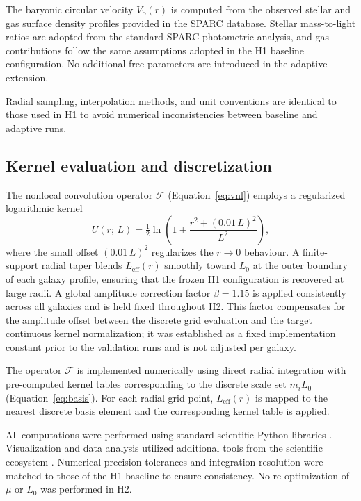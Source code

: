 \documentclass[twocolumn,linenumbers]{aastex701}
\begin{document}
The baryonic circular velocity $V_{\mathrm{b}}(r)$ is computed from the
observed stellar and gas surface density profiles provided in the SPARC
database. Stellar mass-to-light ratios are adopted from the standard SPARC
photometric analysis, and gas contributions follow the same assumptions
adopted in the H1 baseline configuration. No additional free parameters
are introduced in the adaptive extension.

Radial sampling, interpolation methods, and unit conventions are identical
to those used in H1 to avoid numerical inconsistencies between baseline
and adaptive runs.

\subsection{Kernel evaluation and discretization}

The nonlocal convolution operator $\mathcal{F}$ (Equation~\ref{eq:vnl}) employs
a regularized logarithmic kernel
\begin{equation}
	U(r;\,L) = \tfrac{1}{2}\ln\!\left(1 + \frac{r^2 + (0.01\,L)^2}{L^2}\right),
	\label{eq:kernel}
\end{equation}
where the small offset $(0.01\,L)^2$ regularizes the $r \to 0$ behaviour.
A finite-support radial taper blends $L_{\mathrm{eff}}(r)$ smoothly toward
$L_0$ at the outer boundary of each galaxy profile, ensuring that the
frozen H1 configuration is recovered at large radii. A global amplitude
correction factor $\beta = 1.15$ is applied consistently across all
galaxies and is held fixed throughout H2. This factor compensates for
the amplitude offset between the discrete grid evaluation and the target
continuous kernel normalization; it was established as a fixed
implementation constant prior to the validation runs and is not adjusted
per galaxy.

The operator $\mathcal{F}$ is implemented numerically using direct radial
integration with pre-computed kernel tables corresponding to the discrete
scale set $m_i L_0$ (Equation~\ref{eq:basis}). For each radial grid point,
$L_{\mathrm{eff}}(r)$ is mapped to the nearest discrete basis element and
the corresponding kernel table is applied.

All computations were performed using standard scientific Python libraries
\citep{numpy2020, scipy2020}. Visualization and data analysis utilized
additional tools from the scientific ecosystem \citep{matplotlib2007,
pandas2010}. Numerical precision tolerances and integration resolution
were matched to those of the H1 baseline to ensure consistency. No
re-optimization of $\mu$ or $L_0$ was performed in H2.
\end{document}
